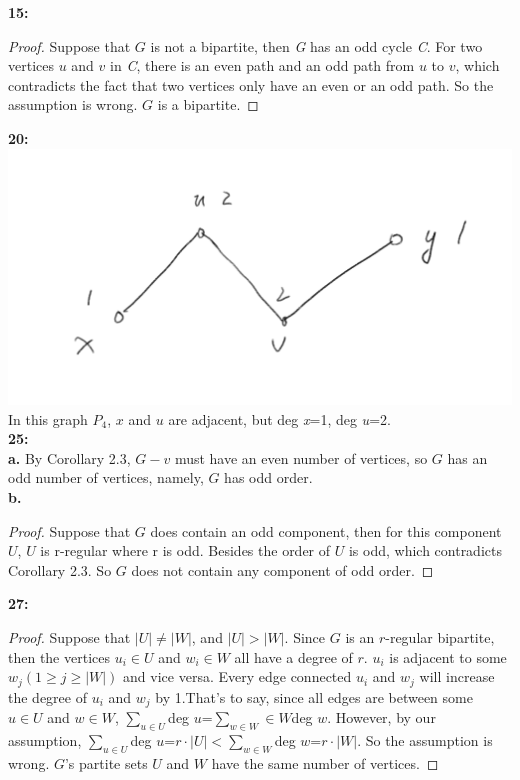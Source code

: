 \documentclass[11pt]{article}
\begin{document}
\textbf{15:}
\begin{proof}
Suppose that $G$ is not a bipartite, then \emph{G} has an odd cycle \emph{C}. For two vertices $u$ and $v$ in \emph{C}, there is an even path and an odd path from $u$ to $v$, which contradicts the fact that two vertices only have an even or an odd path. So the assumption is wrong. $G$ is a bipartite. 
\end{proof}
\textbf{20:}\\
\includegraphics[scale=0.4]{4.png}\\
In this graph $P_4$, $x$ and $u$ are adjacent, but deg \emph{x}=1, deg \emph{u}=2.\\
\textbf{25:}\\
\textbf{a.}
By Corollary 2.3, $G-v$ must have an even number of vertices, so $G$ has an odd number of vertices, namely, $G$ has odd order.\\
\textbf{b.}
\begin{proof}
Suppose that $G$ does contain an odd component, then for this component $U$, $U$ is r-regular where r is odd. Besides the order of $U$ is odd, which contradicts Corollary 2.3. So $G$ does not contain any component of odd order.
\end{proof}   
\textbf{27:}
\begin{proof}
Suppose that $|U|\ne |W|$, and $|U|>|W|$. Since $G$ is an $r$-regular bipartite, then the vertices $u_i\in U$ and $w_i\in W$ all have a degree of $r$. $u_i$ is adjacent to some $w_j(1\ge j\ge|W|)$ and vice versa. Every edge connected $u_i$ and $w_j$ will increase the degree of $u_i$ and $w_j$ by 1.That's to say, since all edges are between some $u\in U$ and $w\in W$, $\sum_{u\in U}$deg $u$=$\sum_{w\in W}\in W$deg $w$. However, by our assumption, $\sum_{u\in U}$deg $u$=$r\cdot |U|<$$\sum_{w\in W}$deg $w$=$r\cdot |W|$. So the assumption is wrong. $G$'s partite sets $U$ and $W$ have the same number of vertices.
\end{proof}
\end{document}
